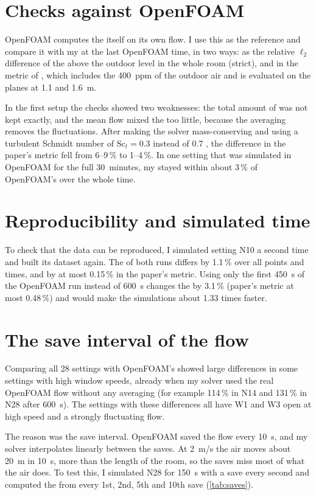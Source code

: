 \section{Checks against OpenFOAM}
OpenFOAM computes the \cotwo{} itself on its own flow. I use this as the reference and compare it with my
\cotwo{} at the last OpenFOAM time, in two ways: as the relative $\ell_2$ difference of the \cotwo{} above
the outdoor level in the whole room (strict), and in the metric of \citet{bian2025}, which includes the
400~ppm of the outdoor air and is evaluated on the planes at 1.1 and 1.6~m.

In the first setup the checks showed two weaknesses: the total amount of \cotwo{} was not kept exactly, and
the mean flow mixed the \cotwo{} too little, because the averaging removes the fluctuations. After making the
solver mass-conserving and using a turbulent Schmidt number of $\mathrm{Sc}_t=0.3$ instead of 0.7
\citep{tominaga2007}, the difference in the paper's metric fell from 6--9\,\% to 1--4\,\%. In one setting
that was simulated in OpenFOAM for the full 30~minutes, my \cotwo{} stayed within about 3\,\% of OpenFOAM's
over the whole time.

\section{Reproducibility and simulated time}
To check that the data can be reproduced, I simulated setting N10 a second time
and built its dataset again. The \cotwo{} of both runs differs by 1.1\,\% over all points and times, and by
at most 0.15\,\% in the paper's metric. Using only the first 450~s of the OpenFOAM run instead of 600~s
changes the \cotwo{} by 3.1\,\% (paper's metric at most 0.48\,\%) and would make the simulations about
1.33 times faster.

\section{The save interval of the flow}
Comparing all 28 settings with OpenFOAM's \cotwo{} showed large differences in some settings with high
window speeds, already when my solver used the real OpenFOAM flow without any averaging (for example
114\,\% in N14 and 131\,\% in N28 after 600~s). The settings with these differences all have W1 and W3 open
at high speed and a strongly fluctuating flow.

The reason was the save interval. OpenFOAM saved the flow every 10~s, and my solver interpolates linearly
between the saves. At 2~m/s the air moves about 20~m in 10~s, more than the length of the room, so the saves
miss most of what the air does. To test this, I simulated N28 for 150~s with a save every second and computed
the \cotwo{} from every 1st, 2nd, 5th and 10th save (\cref{tab:saves}).

